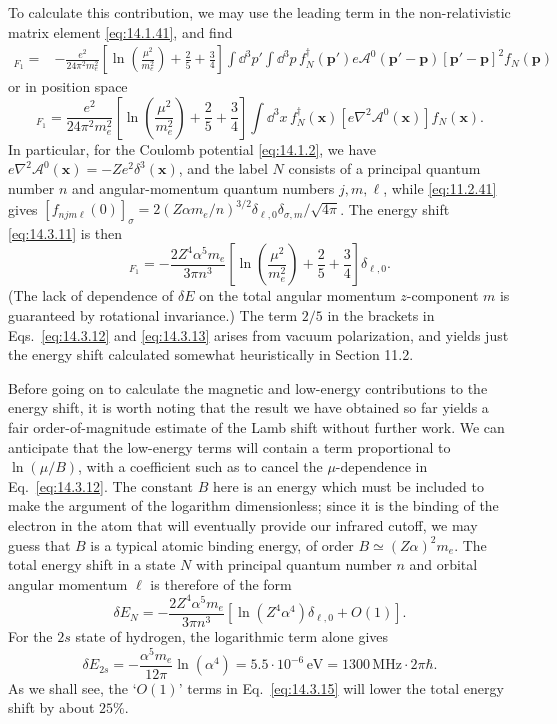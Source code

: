 To calculate this contribution, we may use the leading term in the
non-relativistic matrix element \eqref{eq:14.1.41}, and find
\begin{align}
[\delta E_N]_{F_1}={}&-\frac{e^2}{24\pi^2m_e^2}
\left[\ln\left(\frac{\mu^2}{m_e^2}\right)+\frac25+\frac34\right]
\int \dd^3p'\int \dd^3p\,f_N^\dagger(\mathbf p')
e\mathcal A^0(\mathbf p'-\mathbf p)
[\mathbf p'-\mathbf p]^2f_N(\mathbf p)
\tag{14.3.12}\label{eq:14.3.12}
\end{align}
or in position space
\begin{equation}
[\delta E_N]_{F_1}=\frac{e^2}{24\pi^2m_e^2}
\left[\ln\left(\frac{\mu^2}{m_e^2}\right)+\frac25+\frac34\right]
\int \dd^3x\,f_N^\dagger(\mathbf x)
[e\nabla^2\mathcal A^0(\mathbf x)]f_N(\mathbf x).
\tag{14.3.13}\label{eq:14.3.13}
\end{equation}
In particular, for the Coulomb potential \eqref{eq:14.1.2}, we have
$e\nabla^2\mathcal A^0(\mathbf x)=-Ze^2\delta^3(\mathbf x)$, and the label
$N$ consists of a principal quantum number $n$ and angular-momentum quantum
numbers $j,m,\ell$, while \eqref{eq:11.2.41} gives
$[f_{njm\ell}(0)]_\sigma=2(Z\alpha m_e/n)^{3/2}
\delta_{\ell,0}\delta_{\sigma,m}/\sqrt{4\pi}$. The energy shift
\eqref{eq:14.3.11} is then
\begin{equation}
[\delta E_{nj\ell}]_{F_1}=-\frac{2Z^4\alpha^5m_e}{3\pi n^3}
\left[\ln\left(\frac{\mu^2}{m_e^2}\right)+\frac25+\frac34\right]
\delta_{\ell,0}.
\tag{14.3.14}\label{eq:14.3.14}
\end{equation}
(The lack of dependence of $\delta E$ on the total angular momentum
$z$-component $m$ is guaranteed by rotational invariance.) The term $2/5$ in
the brackets in Eqs.~\eqref{eq:14.3.12} and \eqref{eq:14.3.13} arises from
vacuum polarization, and yields just the energy shift calculated somewhat
heuristically in Section 11.2.

Before going on to calculate the magnetic and low-energy contributions to the
energy shift, it is worth noting that the result we have obtained so far
yields a fair order-of-magnitude estimate of the Lamb shift without further
work. We can anticipate that the low-energy terms will contain a term
proportional to $\ln(\mu/B)$, with a coefficient such as to cancel the
$\mu$-dependence in Eq.~\eqref{eq:14.3.12}. The constant $B$ here is an energy
which must be included to make the argument of the logarithm dimensionless;
since it is the binding of the electron in the atom that will eventually
provide our infrared cutoff, we may guess that $B$ is a typical atomic binding
energy, of order $B\simeq(Z\alpha)^2m_e$. The total energy shift in a state
$N$ with principal quantum number $n$ and orbital angular momentum $\ell$ is
therefore of the form
\begin{equation}
\delta E_N=-\frac{2Z^4\alpha^5m_e}{3\pi n^3}
\left[\ln(Z^4\alpha^4)\delta_{\ell,0}+O(1)\right].
\tag{14.3.15}\label{eq:14.3.15}
\end{equation}
For the $2s$ state of hydrogen, the logarithmic term alone gives
\[
\delta E_{2s}=-\frac{\alpha^5m_e}{12\pi}\ln(\alpha^4)
=5.5\cdot10^{-6}\,\mathrm{eV}=1300\,\mathrm{MHz}\cdot2\pi\hbar.
\]
As we shall see, the `$O(1)$' terms in Eq.~\eqref{eq:14.3.15} will lower the
total energy shift by about $25\%$.

